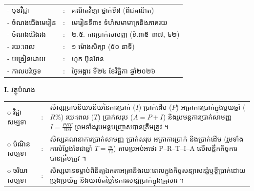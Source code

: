 \documentclass[a4paper,10pt]{article}
\newcommand{\en}[1]{{\TimesEn #1}}
\newcommand{\wcirc}{{\CourierCirc\fontsize{9.5pt}{11pt}\selectfont o}}
\begin{document}
{\renewcommand{\arraystretch}{0.98}
\hspace*{3.1cm}%
\begin{tabular}{@{}l l L{11.0cm}@{}}
  - \hspace{0.35cm} មុខវិជ្ជា & : & គណិតវិទ្យា ថ្នាក់ទី៨ (ពីជគណិត) \\
  - \hspace{0.35cm} ចំណងជើងមេរៀន & : & មេរៀនទី៣៖ ទំហំសមាមាត្រនិងភាគរយ \\
  - \hspace{0.35cm} ចំណងជើងរង & : & ២.៥. ការប្រាក់សាមញ្ញ (ទំ.៣៥–៣៧, ៤២) \\
  - \hspace{0.35cm} រយៈពេល & : & ១ ម៉ោងសិក្សា (៥០ នាទី) \\
  - \hspace{0.35cm} បង្រៀនដោយ & : & ហុក ប៊ុនថែន \\
  - \hspace{0.35cm} កាលបរិច្ឆេទ & : & ថ្ងៃអង្គារ ទី២៤ ខែវិច្ឆិកា ឆ្នាំ២០២៦ \\
\end{tabular}

\vspace{2pt}

\textbf{I.} {\muol វត្ថុបំណង}\\[1pt]
\hspace*{0.45cm}%
\begin{tabular}{@{}l l L{14.85cm}@{}}
  \wcirc \hspace{0.25cm} វិជ្ជាសម្បទា & : & សិស្សប្រាប់និយមន័យនៃការប្រាក់ ($I$) ប្រាក់ដើម ($P$) អត្រាការប្រាក់ក្នុងមួយឆ្នាំ ($R\%$) រយៈពេល ($T$) ប្រាក់សរុប ($A = P + I$) និងរូបមន្តការប្រាក់សាមញ្ញ $I = \frac{PRT}{100}$ ព្រមទាំងរូបមន្តបញ្ច្រាសបានត្រឹមត្រូវ ។ \\
  \wcirc \hspace{0.25cm} បំណិនសម្បទា & : & សិស្សគណនាការប្រាក់សាមញ្ញ ប្រាក់សរុប អត្រាការប្រាក់ និងប្រាក់ដើម (រួមទាំងការបំប្លែងខែជាឆ្នាំ $T = \frac{m}{12}$) តាមប្រអប់អថេរ \en{P--R--T--I--A} លើសន្លឹកកិច្ចការបានត្រឹមត្រូវ ។ \\
  \wcirc \hspace{0.25cm} ចរិយាសម្បទា & : & សិស្សមានទម្លាប់ពិនិត្យឯកតាអត្រានិងរយៈពេលក្នុងកិច្ចសន្យាសន្សំឬខ្ចីប្រាក់ដោយប្រុងប្រយ័ត្ន និងយល់តម្លៃនៃការសន្សំប្រាក់ក្នុងគ្រួសារ ។ \\
\end{tabular}

\vspace{2pt}

}
\end{document}
